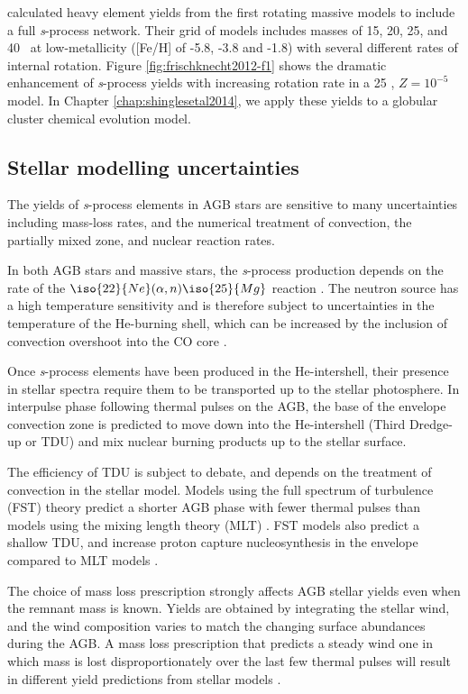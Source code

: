 \documentclass[]{article}
\begin{document}
\citet{Frischknecht:2012il} calculated heavy element yields from the first rotating massive models to include a full \textit{s}-process network. Their grid of models includes masses of 15, 20, 25, and 40 \Msun\ at low-metallicity ([Fe/H] of -5.8, -3.8 and -1.8) with several different rates of internal rotation. Figure \ref{fig:frischknecht2012-f1} shows the dramatic enhancement of \textit{s}-process yields with increasing rotation rate in a 25 \Msun, $Z=10^{-5}$ model. In Chapter \ref{chap:shinglesetal2014}, we apply these yields to a globular cluster chemical evolution model.

\subsection{Stellar modelling uncertainties}

The yields of \textit{s}-process elements in AGB stars are sensitive to many uncertainties including mass-loss rates, and the numerical treatment of convection, the partially mixed zone, and nuclear reaction rates.

In both AGB stars and massive stars, the \textit{s}-process production depends on the rate of the $\iso{22}{Ne}(\alpha,n)\iso{25}{Mg}$ reaction \citep{Longland:2012ix}. The  neutron source has a high temperature sensitivity and is therefore subject to uncertainties in the temperature of the He-burning shell, which can be increased by the inclusion of convection overshoot into the CO core \citep{Herwig:2000ua}.

Once \textit{s}-process elements have been produced in the He-intershell, their presence in stellar spectra require them to be transported up to the stellar photosphere. In interpulse phase following thermal pulses on the AGB, the base of the envelope convection zone is predicted to move down into the He-intershell (Third Dredge-up or TDU) and mix nuclear burning products up to the stellar surface.

The efficiency of TDU is subject to debate, and depends on the treatment of convection in the stellar model. Models using the full spectrum of turbulence (FST) theory predict a shorter AGB phase with fewer thermal pulses than models using the mixing length theory (MLT) \citep{Ventura:2004dp}. FST models also predict a shallow TDU, and increase proton capture nucleosynthesis in the envelope compared to MLT models \citep{Ventura:2005fs}.

The choice of mass loss prescription strongly affects AGB stellar yields even when the remnant mass is known. Yields are obtained by integrating the stellar wind, and the wind composition varies to match the changing surface abundances during the AGB. A mass loss prescription that predicts a steady wind \citep[e.g.,][]{Reimers:1975vw} one in which mass is lost disproportionately over the last few thermal pulses \citep[e.g.,][]{Vassiliadis:1993jk} will result in different yield predictions from stellar models \citep{Stancliffe:2007er}.
\end{document}
